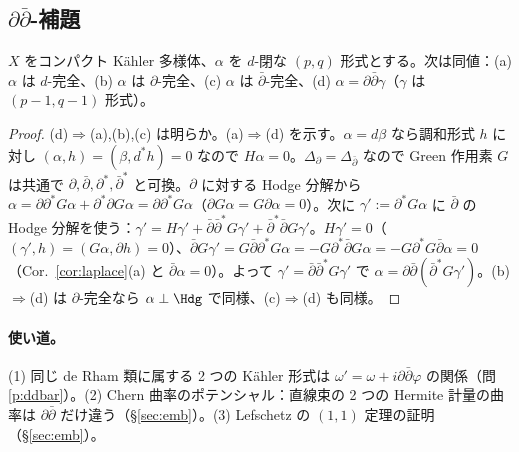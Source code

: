 \subsection{$\partial\bar\partial$-補題}
\begin{thm}\label{thm:ddbar}\tP
$X$ をコンパクト Kähler 多様体、$\alpha$ を $d$-閉な $(p,q)$ 形式とする。次は同値：(a) $\alpha$ は $d$-完全、(b) $\alpha$ は $\partial$-完全、(c) $\alpha$ は $\bar\partial$-完全、(d) $\alpha=\partial\bar\partial\gamma$（$\gamma$ は $(p-1,q-1)$ 形式）。
\end{thm}
\begin{proof}
(d)$\Rightarrow$(a),(b),(c) は明らか。(a)$\Rightarrow$(d) を示す。$\alpha=d\beta$ なら調和形式 $h$ に対し $(\alpha,h)=(\beta,d^*h)=0$ なので $H\alpha=0$。$\Delta_\partial=\Delta_{\bar\partial}$ なので Green 作用素 $G$ は共通で $\partial,\bar\partial,\partial^*,\bar\partial^*$ と可換。$\partial$ に対する Hodge 分解から
$\alpha=\partial\partial^*G\alpha+\partial^*\partial G\alpha=\partial\partial^*G\alpha$（$\partial G\alpha=G\partial\alpha=0$）。次に $\gamma':=\partial^*G\alpha$ に $\bar\partial$ の Hodge 分解を使う：$\gamma'=H\gamma'+\bar\partial\bar\partial^*G\gamma'+\bar\partial^*\bar\partial G\gamma'$。$H\gamma'=0$（$(\gamma',h)=(G\alpha,\partial h)=0$）、$\bar\partial G\gamma'=G\bar\partial\partial^*G\alpha=-G\partial^*\bar\partial G\alpha=-G\partial^*G\bar\partial\alpha=0$（Cor.\ \ref{cor:laplace}(a) と $\bar\partial\alpha=0$）。よって $\gamma'=\bar\partial\bar\partial^*G\gamma'$ で $\alpha=\partial\bar\partial(\bar\partial^*G\gamma')$。(b)$\Rightarrow$(d) は $\partial$-完全なら $\alpha\perp\Hdg$ で同様、(c)$\Rightarrow$(d) も同様。
\end{proof}
\paragraph{使い道。}(1) 同じ de Rham 類に属する 2 つの Kähler 形式は $\omega'=\omega+i\partial\bar\partial\varphi$ の関係（問 \ref{p:ddbar}）。(2) Chern 曲率のポテンシャル：直線束の 2 つの Hermite 計量の曲率は $\partial\bar\partial$ だけ違う（\S\ref{sec:emb}）。(3) Lefschetz の $(1,1)$ 定理の証明（\S\ref{sec:emb}）。

